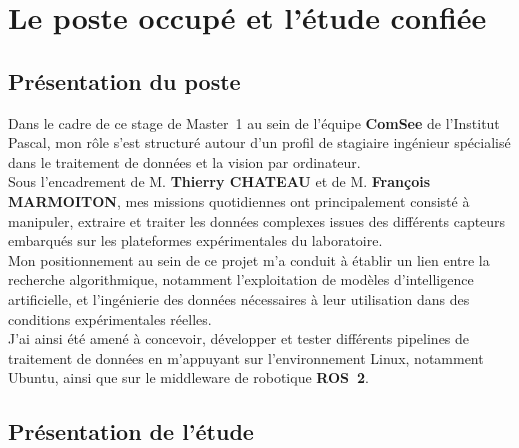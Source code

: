 \documentclass[12pt,a4paper,oneside]{report}
\begin{document}
\chapter{Le poste occupé et l'étude confiée}

\section{Présentation du poste}

\hspace*{0.3cm}Dans le cadre de ce stage de Master~1 au sein de l'équipe \textbf{ComSee} de l'Institut Pascal, mon rôle s'est structuré autour d'un profil de stagiaire ingénieur spécialisé dans le traitement de données et la vision par ordinateur.\\
\hspace*{.3cm}Sous l'encadrement de M. \textbf{Thierry CHATEAU} et de M. \textbf{François MARMOITON}, mes missions quotidiennes ont principalement consisté à manipuler, extraire et traiter les données complexes issues des différents capteurs embarqués sur les plateformes expérimentales du laboratoire.\\

\hspace*{.3cm}Mon positionnement au sein de ce projet m'a conduit à établir un lien entre la recherche algorithmique, notamment l'exploitation de modèles d'intelligence artificielle, et l'ingénierie des données nécessaires à leur utilisation dans des conditions expérimentales réelles.\\
J'ai ainsi été amené à concevoir, développer et tester différents pipelines de traitement de données en m'appuyant sur l'environnement Linux, notamment Ubuntu, ainsi que sur le middleware de robotique \textbf{ROS~2}.

\par\bigskip
\par\bigskip

\section{Présentation de l'étude}
\end{document}
